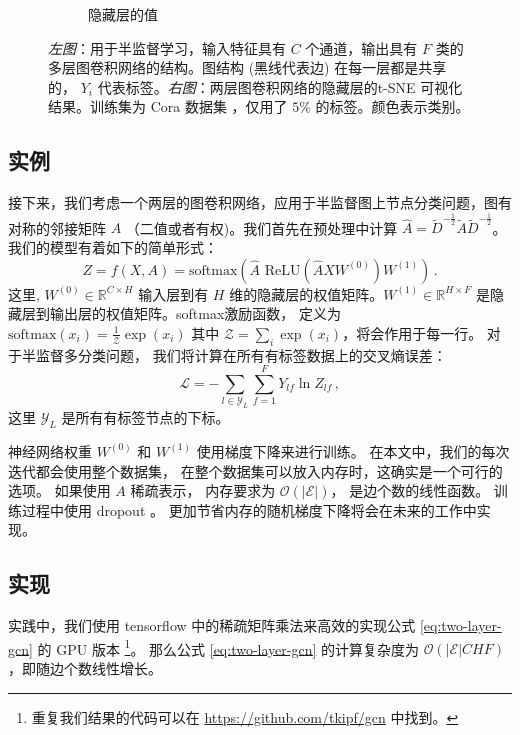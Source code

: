 \documentclass{article} %
\begin{document}
\begin{figure}[htp]
\begin{subfigure}[b]{0.33\textwidth}
        \caption{隐藏层的值}
        \label{fig:model-b}
    \end{subfigure}

    \caption{\emph{左图}：用于半监督学习，输入特征具有 $C$ 个通道，输出具有 $F$ 类的多层图卷积网络的结构。图结构 (黑线代表边) 在每一层都是共享的， $Y_i$ 代表标签。\emph{右图}：两层图卷积网络的隐藏层的t-SNE \citep{maaten2008visualizing} 可视化结果。训练集为 Cora 数据集 \citep{sen2008collective}，仅用了 $5\%$ 的标签。颜色表示类别。}
    \label{fig:model}
\end{figure}

\subsection{实例} \label{sec:model-example} 接下来，我们考虑一个两层的图卷积网络，应用于半监督图上节点分类问题，图有对称的邻接矩阵 $A$ （二值或者有权)。我们首先在预处理中计算 $\hat{A} = \tilde{D}^{-\frac{1}{2}}\tilde{A}\tilde{D}^{-\frac{1}{2}}$。我们的模型有着如下的简单形式：
\begin{equation}
Z= f(X,A) =  \mathrm{softmax}\!\left(\hat{A} \,\, \mathrm{ReLU}\!\left(\hat{A} X W^{(0)} \right) W^{(1)} \right) \, .
\label{eq:two-layer-gcn}
\end{equation}
这里, $W^{(0)}\in \mathbb{R}^{C\times H}$ 输入层到有 $H$ 维的隐藏层的权值矩阵。$W^{(1)}\in \mathbb{R}^{H\times F}$ 是隐藏层到输出层的权值矩阵。softmax激励函数， 定义为 $\mathrm{softmax}(x_i)=\frac{1}{\mathcal{Z}}\exp(x_i)$ 其中 $\mathcal{Z}=\sum_i \exp(x_i)$，将会作用于每一行。 对于半监督多分类问题， 我们将计算在所有有标签数据上的交叉熵误差：
\begin{equation}
\mathcal{L}= -\sum_{l\in\mathcal{Y}_L}\sum_{f=1}^F Y_{lf} \ln Z_{lf}  \, ,
\label{eq:}
\end{equation}
这里 $\mathcal{Y}_L$ 是所有有标签节点的下标。

神经网络权重 $W^{(0)}$ 和 $W^{(1)}$ 使用梯度下降来进行训练。 在本文中，我们的每次迭代都会使用整个数据集， 在整个数据集可以放入内存时，这确实是一个可行的选项。 如果使用 $A$ 稀疏表示， 内存要求为 $\mathcal{O}(|\mathcal{E}|)$， 是边个数的线性函数。 训练过程中使用 dropout \citep{srivastava2014dropout}。 更加节省内存的随机梯度下降将会在未来的工作中实现。

\subsection{实现} 实践中，我们使用 tensorflow  \citep{tensorflow2015-whitepaper} 中的稀疏矩阵乘法来高效的实现公式 \ref{eq:two-layer-gcn} 的 GPU 版本 \footnote{重复我们结果的代码可以在 \url{https://github.com/tkipf/gcn} 中找到。}。 那么公式 \ref{eq:two-layer-gcn} 的计算复杂度为 $\mathcal{O}(|\mathcal{E}|CHF)$，即随边个数线性增长。
\end{document}
